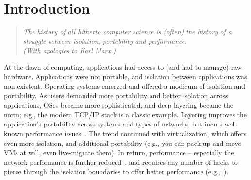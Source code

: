 \section{Introduction} 
\label{sec:introduction}

\begin{quote}
{\em 
The history of all hitherto computer science is (often) the history of a
struggle between isolation, portability and performance. \\ 
(With apologies to Karl Marx.)}
\end{quote}

At the dawn of computing, applications had access to (and had to manage) raw
hardware. Applications were not portable, and isolation between
applications was non-existent. Operating systems emerged and offered a modicum 
of isolation and portability.  As users demanded more portability and better
isolation across applications, OSes became more sophisticated,
and deep layering became the norm; e.g., the modern TCP/IP stack is a classic
example.  Layering improves the application's portability across
systems and types of  networks, but incurs well-known performance
issues~\cite{dcqcn,luigipapers}. The trend continued with virtualization, which offers even more isolation, and
additional portability (e.g., you can pack up and move VMs at will, even live-migrate
them). In return, performance -- especially the network performance is further
reduced~\cite{}, and requires any number of hacks to pierce through the
isolation boundaries to offer better performance (e.g.,~\cite{sriov,netvm,netmap,dpdk}).






